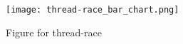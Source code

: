 \begin{figure}[H]
\centering
\texttt{[image: thread-race\_bar\_chart.png]}
\caption{Figure for thread-race}
\end{figure}

